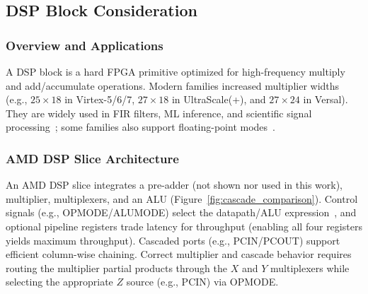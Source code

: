 



\subsection{DSP Block Consideration}
\subsubsection{Overview and Applications}
A DSP block is a hard FPGA primitive optimized for high-frequency multiply and add/accumulate operations. Modern families increased multiplier widths (e.g., $25\times18$ in Virtex-5/6/7, $27\times18$ in UltraScale(+), and $27\times24$ in Versal).
They are widely used in FIR filters, ML inference, and scientific signal processing~\cite{xilinxVirtex-4DSPExplainedFPGA,ghiasiDSPEfficientCNNFPGA2020}; some families also support floating-point modes~\cite{pascaFloatingPointDSPBlock2015}.


\subsubsection{AMD DSP Slice Architecture}
An AMD DSP slice integrates a pre-adder (not shown nor used in this work), multiplier, multiplexers, and an ALU (Figure~\ref{fig:cascade_comparison}).
Control signals (e.g., OPMODE/ALUMODE) select the datapath/ALU expression~\cite{UltraScaleArchitectureDSP2021}, and optional pipeline registers trade latency for throughput (enabling all four registers yields maximum throughput).
Cascaded ports (e.g., PCIN/PCOUT) support efficient column-wise chaining.
Correct multiplier and cascade behavior requires routing the multiplier partial products through the $X$ and $Y$ multiplexers while selecting the appropriate $Z$ source (e.g., PCIN) via OPMODE.




